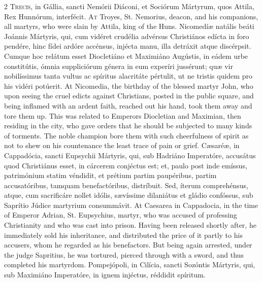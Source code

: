 \begin{paracol}{2}
\lettrine[lines=2]{T}{recis,} in Gállia, 
 sancti Nemórii Diáconi, et Sociórum Mártyrum, quos Attila, Rex Hunnórum, 
 interfécit.
\switchcolumn
{}
\lettrine[lines=2]{A}{t} Troyes, St. Nemorius, deacon, and 
 his companions, all martyrs, who were slain by Attila, king of the Huns.
\switchcolumn*
{}
Nicomedíæ natális beáti 
 Joánnis Mártyris, qui, cum vidéret crudélia advérsus Christiános edícta in 
 foro pendére, hinc fídei ardóre accénsus, injécta manu, illa detráxit atque 
 discérpsit. Cumque hoc relátum esset Diocletiáno et Maximiáno Augústis, 
 in eádem urbe constitútis, ómnia suppliciórum génera in eum experíri 
 jussérunt; quæ vir nobilíssimus tanta vultus ac spíritus alacritáte pértulit, 
 ut ne tristis quidem pro his vidéri potúerit.
\switchcolumn
{}
At Nicomedia, the birthday of the 
 blessed martyr John, who upon seeing the cruel edicts against Christians, 
 posted in the public square, and being inflamed with an ardent faith, 
 reached out his hand, took them away and tore them up. This was 
 related to Emperors Diocletian and Maximian, then residing in the city, who 
 gave orders that he should be subjected to many kinds of torments. The 
 noble champion bore them with such cheerfulness of spirit as not to shew on 
 his countenance the least trace of pain or grief.
\switchcolumn*
{}
Cæsaréæ, in Cappadócia, sancti Eupsychii Mártyris, qui, sub Hadriáno Imperatóre, accusátus quod 
 Christiánus esset, in cárcerem conjéctus est; et, paulo post inde emíssus, 
 patrimónium statim véndidit, et prétium partim paupéribus, partim 
 accusatóribus, tamquam benefactóribus, distríbuit. Sed, íterum 
 comprehénsus, atque, cum sacrificáre nollet idólis, sævíssime dilaniátus et 
 gládio confóssus, sub Saprítio Júdice martyrium consummávit.
\switchcolumn
{}
At Caesarea in Cappadocia, in the 
 time of Emperor Adrian, St. Eupsychius, martyr, who was accused of 
 professing Christianity and who was cast into prison. Having been 
 released shortly after, he immediately sold his inheritance, and distributed 
 the price of it partly to his accusers, whom he regarded as his benefactors. 
 But being again arrested, under the judge Sapritius, he was tortured, 
 pierced through with a sword, and thus completed his martyrdom.
\switchcolumn*
{}
Pompejópoli, in Cilícia, sancti Sozóntis Mártyris, qui, sub Maximiáno Imperatóre, in ignem injéctus, 
 réddidit spíritum.
\switchcolumn

\end{paracol}
